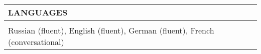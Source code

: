 \documentclass[a4paper,11pt,oneside]{article}
\begin{document}









    


\vspace{18pt}
\noindent \begin{tabularx}{\textwidth}{L r}
    LANGUAGES & \\
    \midrule \\[-10pt]
    Russian (fluent), English (fluent), German (fluent), French (conversational) & \\
\end{tabularx}
\end{document}
